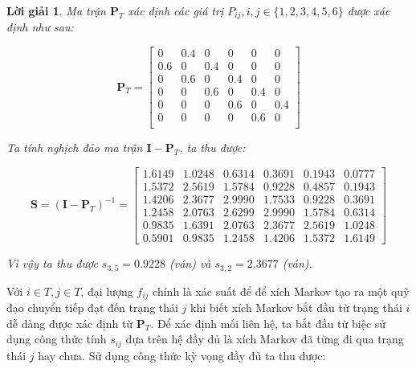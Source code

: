 \documentclass[14pt, a4paper]{article}
\numberwithin{equation}{section}
\numberwithin{figure}{section}
\theoremstyle{sltheorem}
\theoremstyle{soltheorem}
\newtheorem*{loigiai}{Lời giải}
\numberwithin{dl}{section}
\numberwithin{md}{section}
\numberwithin{vd}{section}
\begin{document}
    \begin{loigiai}
        Ma trận $\mathbf{P}_T$ xác định các giá trị $P_{ij}, i, j \in \lbrace 1, 2, 3, 4, 5, 6 \rbrace$ được xác định như sau:

        \begin{equation*}
            \mathbf{P}_T = \begin{bmatrix}
                0 & 0.4 & 0 & 0 & 0 & 0 \\
                0.6 & 0 & 0.4 & 0 & 0 & 0 \\
                0 & 0.6 & 0 & 0.4 & 0 & 0 \\
                0 & 0 & 0.6 & 0 & 0.4 & 0 \\
                0 & 0 & 0 & 0.6 & 0 & 0.4 \\
                0 & 0 & 0 & 0 & 0.6 & 0 \\
            \end{bmatrix}
        \end{equation*}

        Ta tính nghịch đảo ma trận $\mathbf{I} - \mathbf{P}_T$, ta thu được:

        \begin{equation*}
            \mathbf{S}=(\mathbf{I}-\mathbf{P}_T)^{-1}=
            \begin{bmatrix}
            1.6149 & 1.0248 & 0.6314 & 0.3691 & 0.1943 & 0.0777 \\
            1.5372 & 2.5619 & 1.5784 & 0.9228 & 0.4857 & 0.1943 \\
            1.4206 & 2.3677 & 2.9990 & 1.7533 & 0.9228 & 0.3691 \\
            1.2458 & 2.0763 & 2.6299 & 2.9990 & 1.5784 & 0.6314 \\
            0.9835 & 1.6391 & 2.0763 & 2.3677 & 2.5619 & 1.0248 \\
            0.5901 & 0.9835 & 1.2458 & 1.4206 & 1.5372 & 1.6149
            \end{bmatrix}
        \end{equation*}

        Vì vậy ta thu được $s_{3,5}=0.9228$ (ván) và $s_{3,2}=2.3677$ (ván).
    \end{loigiai}

    Với $i \in T, j \in T$, đại lượng $f_{ij}$ chính là xác suất để để xích Markov tạo ra một quỹ đạo chuyển tiếp đạt đến trạng thái $j$ khi biết xích Markov bắt đầu từ trạng thái $i$ dễ dàng được xác định từ $\mathbf{P}_T$.
    Để xác định mối liên hệ, ta bắt đầu từ biệc sử dụng công thức tính $s_{ij}$ dựa trên hệ đầy đủ là xích Markov đã từng đi qua trạng thái $j$ hay chưa.
    Sử dụng công thức kỳ vọng đầy đủ ta thu được:
\end{document}

